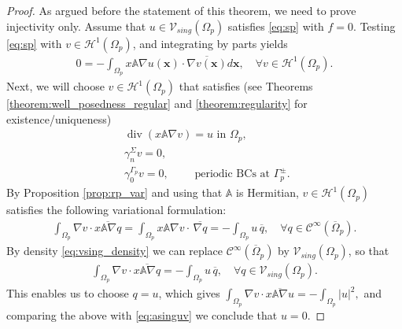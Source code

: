 \documentclass[report]{elsarticle}
\numberwithin{theorem}{section}
\renewcommand{\vec}[1]{\mathbf{#1}}
\begin{document}
\begin{proof}
	As argued before the statement of this theorem, we need to prove injectivity only. Assume that $u\in \mathcal{V}_{sing}(\Omega_p)$ satisfies \eqref{eq:sp} with $f=0$. Testing \eqref{eq:sp} with $v\in \mathcal{H}^1(\Omega_p)$, and integrating by parts yields 
	\begin{align}
		\label{eq:asinguv}
		0=-\int_{\Omega_p}x\mathbb{A}\nabla u(\vec{x})\cdot\overline{\nabla v(\vec{x})}d\vec{x}, \quad \forall v\in \mathcal{H}^1(\Omega_p).
	\end{align}
	Next, we will choose $v\in \mathcal{H}^1(\Omega_p)$ that satisfies (see Theorems \ref{theorem:well_posedness_regular} and \ref{theorem:regularity} for existence/uniqueness)
	\begin{align*}
		&\operatorname{div}(x\mathbb{A}\nabla v)=u \text{ in }\Omega_p,\\ 
		&\gamma_n^{\Sigma}v=0, \\ &\gamma_0^{\Gamma_p}v=0,\qquad
		\text{ periodic BCs at $\Gamma_p^{\pm}$. }
	\end{align*}
	By Proposition \ref{prop:rp_var} and using that $\mathbb{A}$ is Hermitian, $v\in \mathcal{H}^1(\Omega_p)$ satisfies the following variational formulation:
	\begin{align*}
		\int_{\Omega_p}\nabla v\cdot \overline{x\mathbb{A}\nabla q}=	\int_{\Omega_p}x\mathbb{A}\nabla v\cdot\, \overline{\nabla q}=-\int_{\Omega_p}u\, \overline{q}, \quad \forall q\in \mathcal{C}^{\infty}(\overline{\Omega}_p).
	\end{align*} 
	By density \eqref{eq:vsing_density} we can replace $\mathcal{C}^{\infty}(\overline{\Omega}_p)$ by $\mathcal{V}_{sing}(\Omega_p)$, so that
	\begin{align*}
		\int_{\Omega_p}\nabla v\cdot \overline{x\mathbb{A}\nabla q}=-\int_{\Omega_p}u\,\overline{q}, \quad \forall q\in \mathcal{V}_{sing}(\Omega_p).
	\end{align*} 
	This enables us to choose $q=u$, which gives  
	$
	\int_{\Omega_p}\nabla v\cdot\overline{x\mathbb{A}\nabla u}=-\int_{\Omega_p}|u|^2,
	$
	and comparing the above with \eqref{eq:asinguv} we conclude that $u=0$. 
\end{proof}
\end{document}
